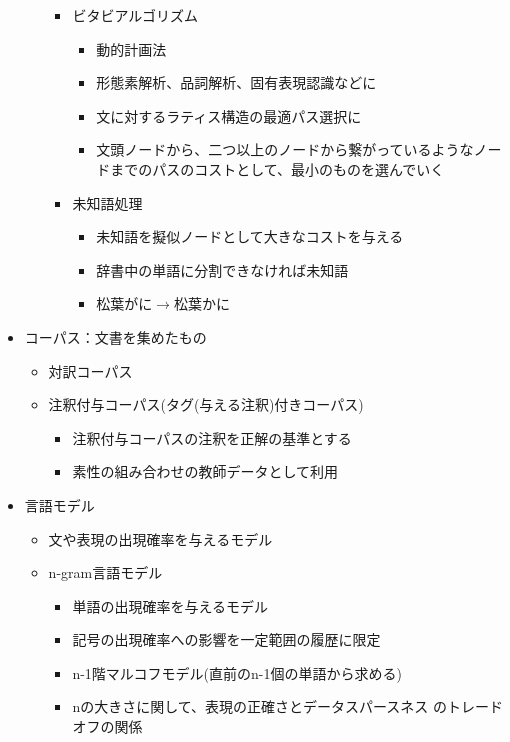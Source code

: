 \documentclass{jsarticle}
\begin{document}
\begin{itemize}
\begin{itemize}
\begin{itemize}
	       \item ビタビアルゴリズム
		     \begin{itemize}
		      \item 動的計画法
		      \item 形態素解析、品詞解析、固有表現認識などに
		      \item 文に対するラティス構造の最適パス選択に
		      \item 文頭ノードから、二つ以上のノードから繋がっているようなノー
	    ドまでのパスのコストとして、最小のものを選んでいく
		     \end{itemize}
	       \item 未知語処理
		     \begin{itemize}
		      \item 未知語を擬似ノードとして大きなコストを与える
		      \item 辞書中の単語に分割できなければ未知語
		      \item 松葉がに$\rightarrow$松葉かに
		     \end{itemize}
	      \end{itemize}
       \end{itemize}
 \item コーパス：文書を集めたもの
       \begin{itemize}
	\item 対訳コーパス
	\item 注釈付与コーパス(タグ(与える注釈)付きコーパス)
	      \begin{itemize}
	       \item 注釈付与コーパスの注釈を正解の基準とする
	       \item 素性の組み合わせの教師データとして利用
	      \end{itemize}
       \end{itemize}
 \item 言語モデル
       \begin{itemize}
	\item 文や表現の出現確率を与えるモデル
	\item n-gram言語モデル
	      \begin{itemize}
	       \item 単語の出現確率を与えるモデル
	       \item 記号の出現確率への影響を一定範囲の履歴に限定
	       \item n-1階マルコフモデル(直前のn-1個の単語から求める)
	       \item nの大きさに関して、表現の正確さとデータスパースネス
		     のトレードオフの関係

\end{itemize}
\end{itemize}
\end{itemize}
\end{document}
